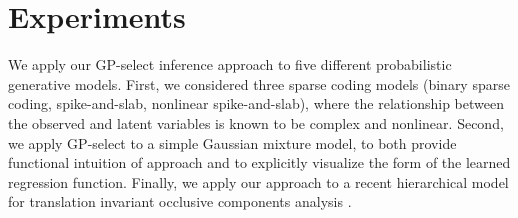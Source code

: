 \section{Experiments}
\label{exps}
%
We apply our GP-select inference approach to five different probabilistic generative models.
%
First, we considered three sparse coding models (binary sparse coding,
spike-and-slab, nonlinear spike-and-slab), where the relationship between the
observed and latent variables is known to be complex and nonlinear.
%
Second, we apply GP-select to a simple Gaussian mixture model,
to both provide functional intuition of approach and to explicitly visualize the form of the learned regression function.
%
Finally, we apply our approach to a recent hierarchical model for translation invariant occlusive components analysis
\citep{DaiLucke2012a,DaiEtAl2013,DaiLucke2014}.


